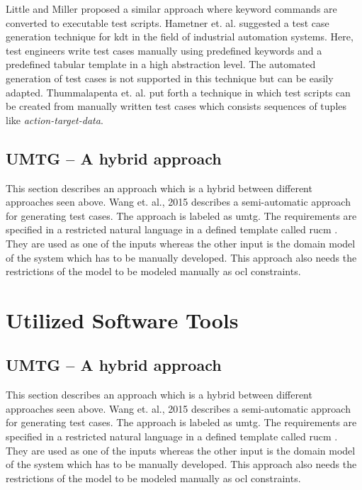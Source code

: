 Little and Miller \cite{little2006translating} proposed a similar approach where keyword commands are converted to executable test scripts. Hametner et. al. \cite{hametner2012agile} suggested a test case generation technique for \gls{kdt} in the field of industrial automation systems. Here, test engineers write test cases manually using predefined keywords and a predefined tabular template in a high abstraction level. The automated generation of test cases is not supported in this technique but can be easily adapted. Thummalapenta et. al. \cite{thummalapenta2012automating} put forth a technique in which test scripts can be created from manually written test cases which consists sequences of tuples like \textit{action-target-data}.


\subsection{UMTG – A hybrid approach}
This section describes an approach which is a hybrid between different approaches seen above. Wang et. al., 2015 \cite{wang2015automatic} describes a semi-automatic approach for generating test cases. The approach is labeled as \gls{umtg}. The requirements are specified in a restricted natural language in a defined template called \gls{rucm} \cite{yue2015rtcm}. They are used as one of the inputs whereas the other input is the domain model of the system which has to be manually developed. This approach also needs the restrictions of the model to be modeled manually as \gls{ocl} constraints. 

\section{Utilized Software Tools}

\subsection{UMTG – A hybrid approach}
This section describes an approach which is a hybrid between different approaches seen above. Wang et. al., 2015 \cite{wang2015automatic} describes a semi-automatic approach for generating test cases. The approach is labeled as \gls{umtg}. The requirements are specified in a restricted natural language in a defined template called \gls{rucm} \cite{yue2015rtcm}. They are used as one of the inputs whereas the other input is the domain model of the system which has to be manually developed. This approach also needs the restrictions of the model to be modeled manually as \gls{ocl} constraints.
